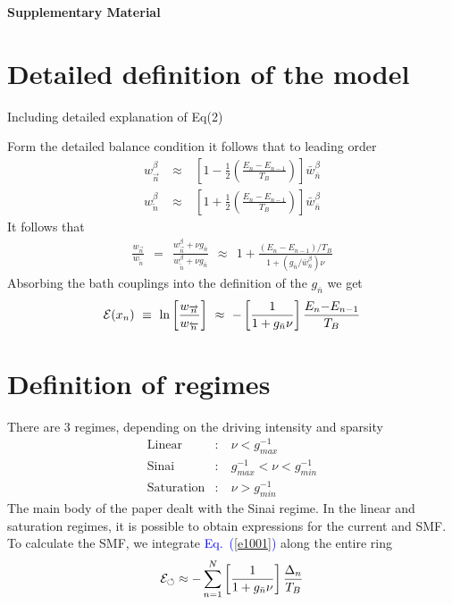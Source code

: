 \documentclass[aps,prl,floats,floatfix,twocolumn]{revtex4}
\newcommand{\mylabel}[1]{\label{#1}}
\newcommand{\beq}{\begin{eqnarray}}
\newcommand{\eeq}{\end{eqnarray}}
\newcommand{\be}[1]{\begin{eqnarray}\ifthenelse{#1=-1}
{\nonumber}{\ifthenelse{#1=0}{}{\mylabel{e#1}}}}
\newcommand{\ee}{\end{eqnarray}}
\newcommand{\Eq}[1]{\textcolor{blue}{Eq.\!\!~(\ref{#1})}}
\begin{document}

\clearpage
\onecolumngrid

\begin{center}
{\LARGE\bf Supplementary Material}
\end{center}



\section{Detailed definition of the model}

Including detailed explanation of Eq(2) 

Form the detailed balance condition it follows that 
to leading order 
%
\beq
w^{\beta}_{\overrightarrow{n}} \ &\approx& \ \left[1-\frac{1}{2}\left(\frac{E_n-E_{n{-}1}}{T_B}\right)\right]\bar{w}_{\bar{n}}^{\beta} \\ 
w^{\beta}_{\overleftarrow{n}} \ &\approx& \ \left[1+\frac{1}{2}\left(\frac{E_n-E_{n{-}1}}{T_B}\right)\right]\bar{w}_{\bar{n}}^{\beta}
\eeq  
%
It follows that 
%
\beq
\frac{w_{\overrightarrow{n}}}{w_{\overleftarrow{n}}} 
\ \ = \ \ \frac{w^{\beta}_{\overrightarrow{n}}+\nu g_{\bar{n}}}{w^{\beta}_{\overleftarrow{n}}+\nu g_{\bar{n}}}
\ \ \approx \ \ 1+ \frac{(E_n-E_{n{-}1})/T_B}{1+(g_{\bar{n}}/\bar{w}_{\bar{n}}^{\beta})\nu}
\eeq
%
Absorbing the bath couplings into the definition of the $g_{\bar{n}}$ we get  
%
\be{1001}
\mathcal{E}(x_n) \ \equiv \ \ln \left[\frac{w_{\overrightarrow{n}}}{w_{\overleftarrow{n}}}\right] 
\ \approx \ - \left[ \frac{1}{1+g_{\bar{n}}\nu} \right] \frac{E_n{-}E_{n{-}1}}{T_B}
\ee

\section{Definition of regimes}

There are 3 regimes, depending on the driving intensity and sparsity
% 
\beq
\text{Linear}&:& \ \nu < g_{max}^{-1} \\
\text{Sinai}&:&  \ g_{max}^{-1} < \nu < g_{min}^{-1}\\
\text{Saturation}&:& \ \nu > g_{min}^{-1}
\eeq
%
The main body of the paper dealt with the Sinai regime.
In the linear and saturation regimes, it is possible to obtain 
expressions for the current and SMF. To calculate the SMF, we integrate  \Eq{e1001} along the entire ring 
%
\be{-1}
\mathcal{E}_{\circlearrowleft} 
\approx  -\sum_{n=1}^N \left[ \frac{1}{1+g_{\bar{n}}\nu} \right] \frac{\Delta_n}{T_B}
\eeq
\end{document}
